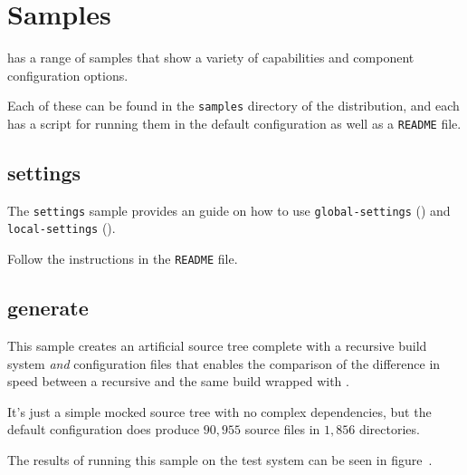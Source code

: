%
%
%
%
\chapter{Samples}\label{chap:samples}

\lmsbw has a range of samples that show a variety of capabilities and
component configuration options.

Each of these can be found in the \texttt{samples} directory of the
\lmsbw distribution, and each has a script for running them in the
default configuration as well as a \texttt{README} file.


\section{settings}\label{samples:settings}
The \texttt{settings} sample provides an guide on how to use
\texttt{global-settings} () and
\texttt{local-settings} ().

Follow the instructions in the \texttt{README} file.

\section{generate}\label{samples:generate}

This sample creates an artificial source tree complete with a
recursive \make build system \emph{and} \lmsbw configuration files
that enables the comparison of the difference in speed between a
recursive \make and the same build wrapped with \lmsbw.

It's just a simple mocked source tree with no complex dependencies,
but the default configuration does produce $90,955$ source files in
$1,856$ directories.

The results of running this sample on the test system can be seen in
figure~.

